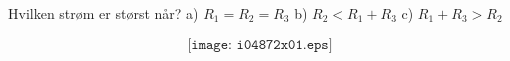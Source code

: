 

Hvilken strøm er størst når?
\vskip 10pt
a) $R_1=R_2=R_3$
\vskip 10pt
b) $R_2<R_1 + R_3$
\vskip 10pt
c) $R_1+R_3>R_2$
\vskip 10pt

$$\texttt{[image: i04872x01.eps]}$$




















